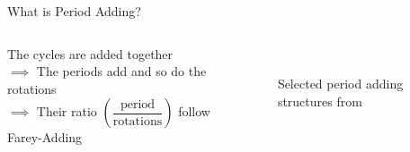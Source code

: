 \begin{frame}{What is Period Adding?}
\begin{columns}
\begin{column}{.6 \textwidth}
            \pause
            \vspace{1em}
            The cycles are added together \\
            $\implies$ The periods add and so do the rotations \\ \pause
            $\implies$ Their ratio $\left(\dfrac{\text{period}}{\text{rotations}}\right)$ follow Farey-Adding
        \end{column}
        \begin{column}{.4 \textwidth}
            \vspace{-3em}
            \begin{figure}
                \centering
                \\
                \caption{Selected period adding structures from \cite{simpson2010}}
            \end{figure}
        \end{column}
    \end{columns}
\end{frame}

